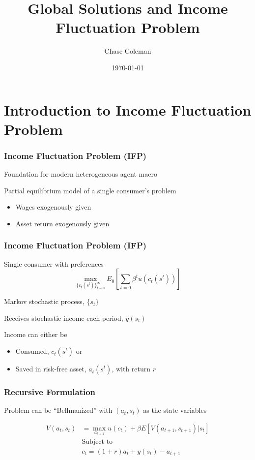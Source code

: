 \documentclass[10pt]{beamer}
\title{Global Solutions and Income Fluctuation Problem}
\author{Chase Coleman}
\institute{NYU Stern}
\date[]{\today}
\begin{document}
\begin{frame}
  \thispagestyle{empty}
  \titlepage
\end{frame}


\section{Introduction to Income Fluctuation Problem}

\begin{frame} \frametitle{Income Fluctuation Problem (IFP)}

  Foundation for modern heterogeneous agent macro

  \vspace{0.5cm}

  Partial equilibrium model of a single consumer's problem
  \begin{itemize}
    \item Wages exogenously given
    \item Asset return exogenously given
  \end{itemize}

\end{frame}

\begin{frame} \frametitle{Income Fluctuation Problem (IFP)}

  Single consumer with preferences $$\max_{\{c_t(s^t)\}_{t=0}^{\infty}} E_0 \left[ \sum_{t=0} \beta^t u(c_t(s^t)) \right]$$

  Markov stochastic process, $\{ s_t \}$

  Receives stochastic income each period, $y(s_t)$

  Income can either be
  \begin{itemize}
    \item Consumed, $c_t(s^t)$ or
    \item Saved in risk-free asset, $a_t(s^t)$, with return $r$
  \end{itemize}

\end{frame}

\begin{frame} \frametitle{Recursive Formulation}

  Problem can be ``Bellmanized'' with $(a_t, s_t)$ as the state variables

  \begin{align*}
    V(a_t, s_t) &= \max_{a_{t+1}} u(c_t) + \beta E \left[ V(a_{t+1}, s_{t+1}) | s_t \right] \\
              &\text{Subject to} \\
              &c_t = (1 + r) a_t + y(s_t) - a_{t+1}
  \end{align*}

\end{frame}
\end{document}
